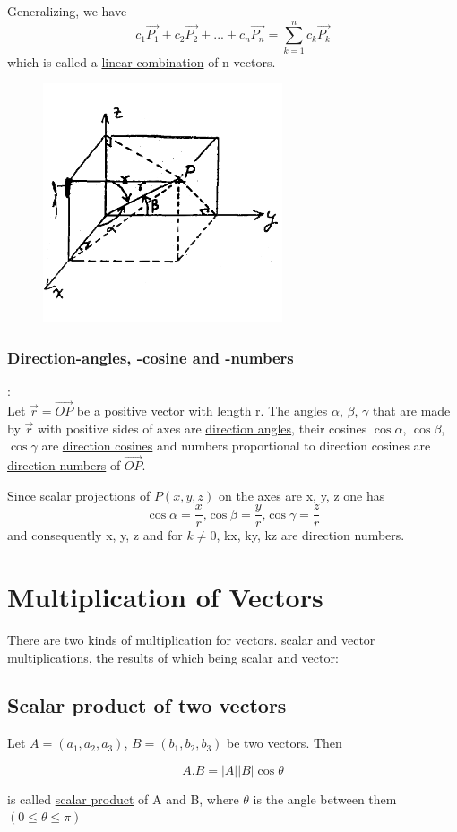 \documentclass[11pt]{amsbook}
\begin{document}
    
    Generalizing, we have 
    \[c_1\overrightarrow{P_1} + c_2\overrightarrow{P_2} + ... + c_n\overrightarrow{P_n} = 
\sum_{k=1}^{n} c_k\overrightarrow{P_k} \]
which is called a \underline{linear combination} of n vectors.

\begin{figure}
    \includegraphics[scale=0.4]{b2p1-126-fig01}
\end{figure}

\subsubsection{Direction-angles, -cosine and -numbers} : \\
Let $\overrightarrow{r} = \overrightarrow{OP}$ be a positive vector with length r. The angles $\alpha$, $\beta$, $\gamma$ that are made by $\overrightarrow{r}$ with positive sides of axes are \underline{direction angles}, their cosines $\cos\alpha$, $\cos\beta$, $\cos\gamma$ are \underline{direction cosines} and numbers proportional to direction cosines are \underline{direction numbers} of $\overrightarrow{OP}$.

\par Since scalar projections of $P(x, y, z)$ on the axes are x, y, z one has 
\[ \cos\alpha = \frac{x}{r} \text{,} \cos\beta = \frac{y}{r} \text{,} \cos\gamma = \frac{z}{r}\]
and consequently x, y, z and for $k \neq 0$, kx, ky, kz are direction numbers.

\section{Multiplication of Vectors}
There are two kinds of multiplication for vectors. scalar
and vector multiplications, the results of which being scalar and
vector: 
\subsection{Scalar product of two vectors}
Let $A = (a_1, a_2, a_3)$, $B = (b_1, b_2, b_3)$ be two vectors. Then

\[ A.B = |A||B|\cos\theta\]

is called \underline{scalar product} of A and B, where $\theta$ is the angle between them $(0 \leq \theta \leq \pi)$
\end{document}
